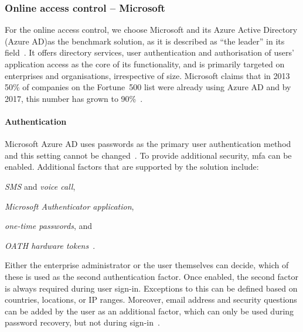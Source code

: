 \subsubsection{Online access control -- Microsoft}\label{sec:online-access-control}

For the online access control, we choose Microsoft and its Azure Active Directory (Azure AD)\footnotemark as the benchmark solution, as it is described as ``the leader'' in its field~\cite{Kreizman2018MagicWorldwide}. It offers directory services, user authentication and authorisation of users' application access as the core of its functionality, and is primarily targeted on enterprises and organisations, irrespective of size. Microsoft claims that in 2013 50\% of companies on the Fortune~500 list were already using Azure AD and by 2017, this number has grown to 90\%~\cite{Martin201350Azure}.


\paragraph{Authentication} Microsoft Azure AD uses passwords as the primary user authentication method and this setting cannot be changed~\cite{Flores2019AuthenticationMethods}. To provide additional security, \acrlong{mfa} can be enabled. Additional factors that are supported by the solution include:
\begin{enumerate*}[label=(\roman*)]
    \item \textit{SMS} and \textit{voice call},
    \item \textit{Microsoft Authenticator application},
    \item \textit{one-time passwords}, and 
    \item \textit{OATH hardware tokens}\footnotemark~\cite{Flores2019AuthenticationMethods}.
\end{enumerate*}

Either the enterprise administrator or the user themselves can decide, which of these is used as the second authentication factor. Once enabled, the second factor is always required during user sign-in. Exceptions to this can be defined based on countries, locations, or IP ranges. Moreover, email address and security questions can be added by the user as an additional factor, which can only be used during password recovery, but not during sign-in~\cite{eross-msft2018ConfigureAuthentication}.

